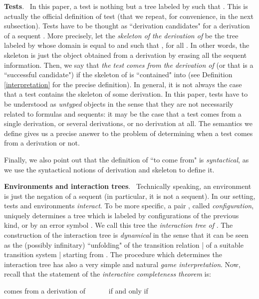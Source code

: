 \documentclass[copyright,creativecommons]{eptcs}
\newcommand{\cT}{\mathcal{T}}
\newcommand{\bS}{\mathbf{S}}
\theoremstyle{definition}
\newcommand{\squishlist}{
 \begin{list}{}
  { \setlength{\itemsep}{0pt}
     \setlength{\parsep}{3pt}
     \setlength{\topsep}{3pt}
     \setlength{\partopsep}{0pt}
     \setlength{\leftmargin}{1em}
     \setlength{\labelwidth}{1.5em}
     \setlength{\labelsep}{0.5em} } }
\newcommand{\squishend}{
  \end{list}  }
\begin{document}
\noindent \textbf{Tests}. \  In this paper,  a test is nothing but
 a tree  labeled by  such that
. This is actually the official definition of test  (that we repeat, for convenience, in the next subsection). Tests have to be thought as ``derivation candidates" for a derivation   of a sequent
. More precisely,  let the \emph{skeleton of the derivation  of } be
the tree  labeled by  whose domain is equal to  and such that , for all .  In other words,
the skeleton is just the object obtained
from a derivation  by erasing all the sequent information.
Then,
we say that \emph{the test  comes from the derivation  of }
(or that  is a ``successful candidate")
if   the skeleton of  is ``contained"
into  (see Definition \ref{interpretation} for the precise definition).
In general,  it is not  always the case that a test
contains the skeleton of some derivation.
In this paper, tests have to be understood as  \emph{untyped} objects in the sense that they are not necessarily related to formulas and sequents:
it may be the case that a test comes from a single derivation, or several derivations, or no derivation at all. The semantics we  define gives us a precise answer to the problem of determining when a test comes from a derivation or not.

 Finally, we also point out that the definition of ``to come from"
is \emph{syntactical}, as we use
the syntactical notions of derivation and skeleton  to define it.\\



\vspace{-3.5mm}

\noindent \textbf{Environments and interaction trees}. \
Technically speaking, an environment is just
the negation  of a sequent  (in particular, it is not a sequent).  In our setting,  tests and environments
\emph{interact}.
To be more specific, a pair
, called
\emph{configuration},
uniquely determines a tree which is labeled by configurations of the previous kind, or by  an error symbol . We call this tree the \emph{interaction tree of} .
The construction of the interaction tree is \emph{dynamical} in the sense that it can be seen as the (possibly
infinitary) ``unfolding" of the transition relation |  of a suitable  transition system |  starting from  . The procedure which determines the interaction tree has also a very simple and
natural  \emph{game interpretation}.
Now, recall that the statement of the \emph{interactive completeness theorem} is:
\vspace{-0.00cm}
\squishlist
\item[] {\centering
 comes from a derivation  of  \ \ \ \ \ \ if and only if \ \ \ \ \ \ \cT\neg \bS \par}
\squishend
\end{document}
